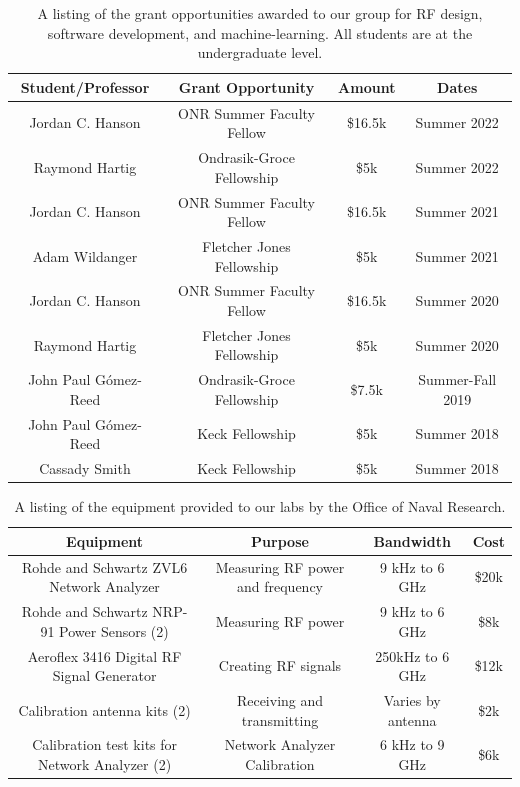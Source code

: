 \documentclass[../../main.tex]{subfiles}
\begin{document}
\begin{table}[hb]
\centering
\begin{tabular}{c c c c}
Student/Professor & Grant Opportunity & Amount & Dates \\ \hline
Jordan C. Hanson & ONR Summer Faculty Fellow & \$16.5k & Summer 2022 \\
Raymond Hartig & Ondrasik-Groce Fellowship & \$5k & Summer 2022 \\
Jordan C. Hanson & ONR Summer Faculty Fellow & \$16.5k & Summer 2021 \\
Adam Wildanger & Fletcher Jones Fellowship & \$5k & Summer 2021 \\
Jordan C. Hanson & ONR Summer Faculty Fellow & \$16.5k & Summer 2020 \\
Raymond Hartig & Fletcher Jones Fellowship & \$5k & Summer 2020 \\
John Paul G\'{o}mez-Reed & Ondrasik-Groce Fellowship & \$7.5k & Summer-Fall 2019 \\
John Paul G\'{o}mez-Reed & Keck Fellowship & \$5k & Summer 2018 \\
Cassady Smith & Keck Fellowship & \$5k & Summer 2018 \\
\end{tabular}
\caption{\label{tab:funds} A listing of the grant opportunities awarded to our group for RF design, softrware development, and machine-learning.  All students are at the undergraduate level.}
\end{table}

\begin{table}
\centering
\begin{tabular}{c c c c}
Equipment & Purpose & Bandwidth & Cost \\ \hline
Rohde and Schwartz ZVL6 Network Analyzer & Measuring RF power and frequency & 9 kHz to 6 GHz & \$20k \\
Rohde and Schwartz NRP-91 Power Sensors (2) & Measuring RF power & 9 kHz to 6 GHz & \$8k \\
Aeroflex 3416 Digital RF Signal Generator & Creating RF signals & 250kHz to 6 GHz & \$12k \\
Calibration antenna kits (2) & Receiving and transmitting & Varies by antenna & \$2k \\
Calibration test kits for Network Analyzer (2) & Network Analyzer Calibration & 6 kHz to 9 GHz & \$6k
\end{tabular}
\caption{\label{tab:equip} A listing of the equipment provided to our labs by the Office of Naval Research.}
\end{table}
\end{document}
